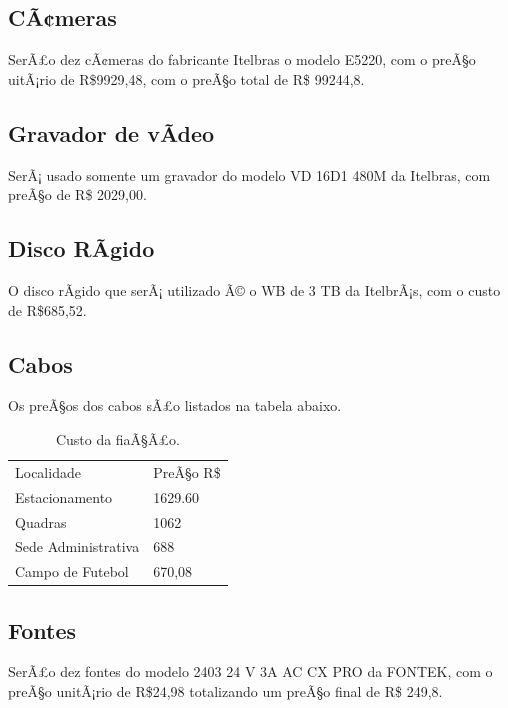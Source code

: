\subsection{CÃ¢meras}
SerÃ£o dez cÃ¢meras do fabricante Itelbras o modelo E5220, com o preÃ§o uitÃ¡rio de R\$9929,48, com o preÃ§o total de R\$ 99244,8.

\subsection{Gravador de vÃ­deo}
SerÃ¡ usado somente um gravador do modelo VD 16D1 480M da Itelbras, com preÃ§o de R\$ 2029,00.

\subsection{Disco RÃ­gido}
O disco rÃ­gido que serÃ¡ utilizado Ã© o WB de 3 TB da ItelbrÃ¡s,  com o custo de R\$685,52.

\subsection{Cabos}
Os preÃ§os dos cabos sÃ£o listados na tabela abaixo. 

\begin{table}[h]
\centering
\caption{Custo da fiaÃ§Ã£o.}
\label{Custo da fiaÃ§Ã£o}
\begin{tabular}{lll}
 &  &  \\ \hline
\multicolumn{1}{|l|}{Localidade} & \multicolumn{2}{l|}{PreÃ§o R\$} \\ \hline
\multicolumn{1}{|l|}{Estacionamento} & \multicolumn{2}{l|}{1629.60} \\ \hline
\multicolumn{1}{|l|}{Quadras} & \multicolumn{2}{l|}{1062} \\ \hline
\multicolumn{1}{|l|}{Sede Administrativa} & \multicolumn{2}{l|}{688} \\ \hline
\multicolumn{1}{|l|}{Campo de Futebol} & \multicolumn{2}{l|}{670,08} \\ \hline
\end{tabular}
\end{table}

\subsection{Fontes}

SerÃ£o dez fontes do modelo 2403 24 V 3A AC CX PRO da FONTEK, com o preÃ§o unitÃ¡rio de R\$24,98 totalizando um preÃ§o final de R\$ 249,8.


